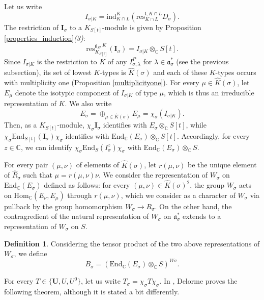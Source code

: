 \documentclass{amsart}
\theoremstyle{definition}
\newtheorem{definition}[theorem]{Definition}
\begin{document}
Let us write
\[I_{\sigma|K} = \mathrm{ind}_{K\cap L}^{K}(\mathrm{res}_{K\cap L}^{\mathfrak{l}, K\cap L} D_\sigma).\]
The restriction of $\bm{I}_\sigma$ to a $K_{S[t]}$-module is given by Proposition \ref{properties_induction}\textit{(3)}:
\begin{equation}\label{compact_piucture_Isigma}\mathrm{res}_{K_{S[t]}}^{\bm{\mathfrak{g}}_S, K}(\bm{I}_\sigma) = I_{\sigma|K}  \otimes_\mathbb{C} S[t].\end{equation} Since $I_{\sigma|K}$ is the restriction to $K$ of any $I^P_{\sigma,\lambda}$ for $\lambda \in \mathfrak{a}_\sigma^*$ (see the previous subsection), its set of lowest $K$-types is $\widehat{K}(\sigma)$ and each of these $K$-types occurs with multiplicity one (Proposition \ref{multiplicityone}). For every $\mu \in \widehat{K}(\sigma)$, let $E_\mu$ denote the isotypic component of $I_{\sigma|K}$ of type $\mu$, which is thus an irreducible representation of $K$. We also write
\[E_\sigma  = \oplus_{\mu \in \widehat{K}(\sigma)} E_\mu = \chi_\sigma (I_{\sigma|K}).\]
Then, as a $K_{S[t]}$-module, $\chi_\sigma \bm{I}_\sigma$ identifies with $E_\sigma \otimes_\mathbb{C} S[t]$, while $\chi_\sigma \mathrm{End}_{S[t]}(\bm{I}_\sigma) \chi_\sigma$ identifies with $\mathrm{End}_\mathbb{C}(E_\sigma) \otimes_\mathbb{C} S[t]$. Accordingly, for every $z \in \mathbb{C}$, we can identify $\chi_\sigma \mathrm{End}_{S}(I^z_\sigma) \chi_\sigma$ with $\mathrm{End}_\mathbb{C}(E_\sigma) \otimes_\mathbb{C} S$.

For every pair $(\mu,\nu)$ of elements of $\widehat{K}(\sigma)$, let $r(\mu,\nu)$ be the unique element of $\hat{R}_\sigma$ such that $\mu = r(\mu,\nu) \nu$. We consider the representation of $W_\sigma$ on $\mathrm{End}_\mathbb{C}(E_\sigma)$ defined as follows: for every $(\mu,\nu)\in \widehat{K}(\sigma)^2$, the group $W_\sigma$ acts on $\mathrm{Hom}_\mathbb{C}(E_\nu, E_\mu)$ through $r(\mu,\nu)$, which we consider as a character of $W_\sigma$ via pullback by the group homomorphism $W_\sigma \to R_\sigma$. On the other hand, the contragredient of the natural representation of $W_\sigma$ on $\mathfrak{a}_\sigma^*$ extends to a representation of $W_\sigma$ on $S$.

\begin{definition}\label{def_Bsigma}
    Considering the tensor product of the two above representations of $W_\sigma$, we define
    \[B_\sigma = \left(\mathrm{End}_\mathbb{C}(E_\sigma) \otimes_\mathbb{C} S \right)^{W\sigma}.\]

\end{definition}
For every $T \in \{\bm{U}, U, U^0\}$, let us write $T_\sigma = \chi_\sigma T\chi_\sigma$. In \cite{Delorme84}, Delorme proves the following theorem, although it is stated a bit differently.
\end{document}
